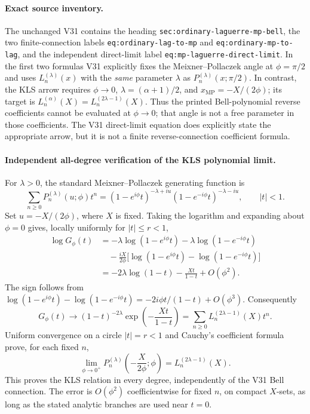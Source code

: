 \documentclass[11pt]{article}
\begin{document}
\paragraph{Exact source inventory.}
The unchanged V31 contains the heading \texttt{sec:ordinary-laguerre-mp-bell}, the two finite-connection labels \texttt{eq:ordinary-lag-to-mp} and \texttt{eq:ordinary-mp-to-lag}, and the independent direct-limit label \texttt{eq:mp-laguerre-direct-limit}. In the first two formulas V31 explicitly fixes the Meixner--Pollaczek angle at $\phi=\pi/2$ and uses $L_n^{(\lambda)}(x)$ with the \emph{same} parameter $\lambda$ as $P_n^{(\lambda)}(x;\pi/2)$. In contrast, the KLS arrow requires $\phi\to0$, $\lambda=(\alpha+1)/2$, and $x_{\mathrm{MP}}=-X/(2\phi)$; its target is $L_n^{(\alpha)}(X)=L_n^{(2\lambda-1)}(X)$. Thus the printed Bell-polynomial reverse coefficients cannot be evaluated at $\phi\to0$; that angle is not a free parameter in those coefficients. The V31 direct-limit equation does explicitly state the appropriate arrow, but it is not a finite reverse-connection coefficient formula.

\paragraph{Independent all-degree verification of the KLS polynomial limit.}
For $\lambda>0$, the standard Meixner--Pollaczek generating function is
\[
 \sum_{n\ge0}P_n^{(\lambda)}(u;\phi)t^n
 =(1-e^{i\phi}t)^{-\lambda+iu}
  (1-e^{-i\phi}t)^{-\lambda-iu},\qquad |t|<1.
\]
Set $u=-X/(2\phi)$, where $X$ is fixed. Taking the logarithm and expanding about $\phi=0$ gives, locally uniformly for $|t|\le r<1$,
\[
\begin{aligned}
 \log G_{\phi}(t)
 &=-\lambda\log(1-e^{i\phi}t)
   -\lambda\log(1-e^{-i\phi}t)\\
 &\quad-\frac{iX}{2\phi}
  \bigl[\log(1-e^{i\phi}t)-\log(1-e^{-i\phi}t)\bigr]\\
 &=-2\lambda\log(1-t)-\frac{Xt}{1-t}+O(\phi^2).
\end{aligned}
\]
The sign follows from $\log(1-e^{i\phi}t)-\log(1-e^{-i\phi}t)=-2i\phi t/(1-t)+O(\phi^3)$. Consequently
\[
 G_{\phi}(t)\longrightarrow
 (1-t)^{-2\lambda}\exp\!\left(-\frac{Xt}{1-t}\right)
 =\sum_{n\ge0}L_n^{(2\lambda-1)}(X)t^n.
\]
Uniform convergence on a circle $|t|=r<1$ and Cauchy's coefficient formula prove, for each fixed $n$,
\[
\boxed{\lim_{\phi\to0^+}P_n^{(\lambda)}\!\left(-\frac{X}{2\phi};\phi\right)
 =L_n^{(2\lambda-1)}(X).}
\]
This proves the KLS relation in every degree, independently of the V31 Bell connection. The error is $O(\phi^2)$ coefficientwise for fixed $n$, on compact $X$-sets, as long as the stated analytic branches are used near $t=0$.
\end{document}
